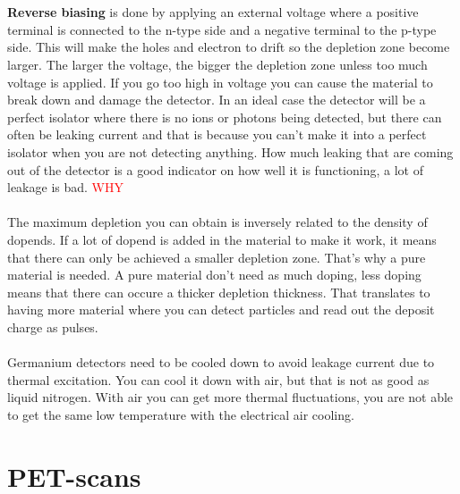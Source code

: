 \documentclass[twoside,english]{uiofysmaster/uiofysmaster}
\begin{document}
\\
\\
\textbf{Reverse biasing} is done by applying an external voltage where a positive terminal is connected to the n-type side and a negative terminal to the p-type side. This will make the holes and electron to drift so the depletion zone become larger. The larger the voltage, the bigger the depletion zone unless too much voltage is applied. If you go too high in voltage you can cause the material to break down and damage the detector.
In an ideal case the detector will be a perfect isolator where there is no ions or photons being detected, but there can often be leaking current and that is because you can’t make it into a perfect isolator when you are not detecting anything. How much leaking that are coming out of the detector is a good indicator on how well it is functioning, a lot of leakage is bad. \textcolor{red}{WHY}\\
\\
The maximum depletion you can obtain is inversely related to the density of dopends. If a lot of dopend is added in the material to make it work, it means that there can only be achieved a smaller depletion zone. That’s why a pure material is needed. A pure material don’t need as much doping, less doping means that there can occure a thicker depletion thickness. That translates to having more material where you can detect particles and read out the deposit charge as pulses.
\\
\\

Germanium detectors need to be cooled down to avoid leakage current due to thermal excitation. You can cool it down with air, but that is not as good as liquid nitrogen. With air you can get more thermal fluctuations, you are not able to get the same low temperature with the electrical air cooling. 
\\

\section{PET-scans}
\label{sec:PET}
\end{document}
